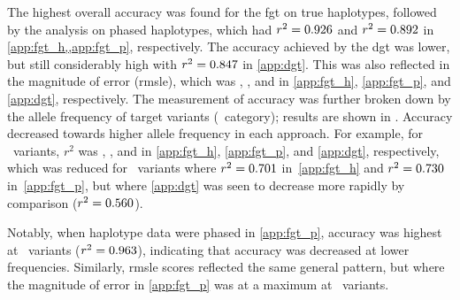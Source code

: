 The highest overall accuracy was found for the \gls{fgt} on true haplotypes, followed by the analysis on phased haplotypes, which had ${r^2 = \dec{0.9262482}}$ and ${r^2 = \dec{0.8922048}}$ in \cref{app:fgt_h,,app:fgt_p}, respectively.
The accuracy achieved by the \gls{dgt} was lower, but still considerably high with ${r^2 = \dec{0.8474036}}$ in \cref{app:dgt}.
This was also reflected in the  magnitude of error (\gls{rmsle}), which was , , and  in \ref{app:fgt_h}, \ref{app:fgt_p}, and \ref{app:dgt}, respectively.
The measurement of accuracy was further broken down by the allele frequency of target variants (\fk{}~category); results are shown in .
Accuracy decreased towards higher allele frequency in each approach.
For example, for ~variants, $r^2$ was , , and  in \ref{app:fgt_h}, \ref{app:fgt_p}, and \ref{app:dgt}, respectively,
which was reduced for ~variants where ${r^2 = \dec{0.701}}$ in~\ref{app:fgt_h} and ${r^2 = \dec{0.730}}$ in~\ref{app:fgt_p}, but where \ref{app:dgt} was seen to decrease more rapidly by comparison (${r^2 = \dec{0.560}}$).

Notably, when haplotype data were phased in \ref{app:fgt_p}, accuracy was highest at ~variants (${r^2 = \dec{0.963}}$), indicating that accuracy was decreased at lower frequencies.
Similarly, \gls{rmsle} scores reflected the same general pattern, but where the magnitude of error in \ref{app:fgt_p} was at a maximum at ~variants.
  

%

%

